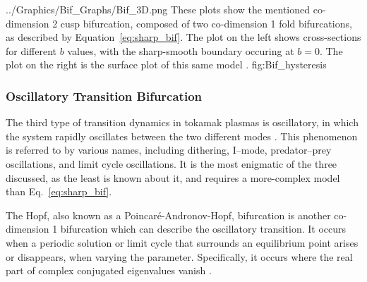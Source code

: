 	{../Graphics/Bif_Graphs/Bif_3D.png}
	{These plots show the mentioned co-dimension 2 cusp bifurcation, composed of two co-dimension 1 fold bifurcations, as described by Equation~\ref{eq:sharp_bif}.
	The plot on the left shows cross-sections for different $b$ values, with the sharp-smooth boundary occuring at $b = 0$.
	The plot on the right is the surface plot of this same model \cite{weymiens_bifurcation_2014}.}
	{fig:Bif_hysteresis}

\subsubsection{Oscillatory Transition Bifurcation}
The third type of transition dynamics in tokamak plasmas is oscillatory, in which the system rapidly oscillates between the two different modes \cite{ryter_survey_2013} \cite{zohm_mhd_1995}.
This phenomenon is referred to by various names, including dithering, I--mode, predator--prey oscillations, and limit cycle oscillations.
It is the most enigmatic of the three discussed, as the least is known about it, and requires a more-complex model than Eq.~\ref{eq:sharp_bif}.

The Hopf, also known as a Poincar\'e-Andronov-Hopf, bifurcation is another co-dimension 1 bifurcation which can describe the oscillatory transition.
It occurs when a periodic solution or limit cycle that surrounds an equilibrium point arises or disappears, when varying the parameter.
Specifically, it occurs where the real part of complex conjugated eigenvalues vanish \cite{munoz-alicea_introduction_2011}.

